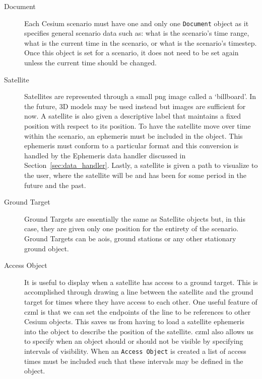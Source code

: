 \begin{description} 

    \item[Document] Each Cesium scenario must have one and only one
	\texttt{Document} object as it specifies general scenario data such as:
	what is the scenario's time range, what is the current time in the
	scenario, or what is the scenario's timestep. Once this object is set
	for a scenario, it does not need to be set again unless the current
	time should be changed.

    \item[Satellite] Satellites are represented through a small \gls{png} image
	called a `billboard'. In the future, 3D models may be used instead but
	images are sufficient for now. A satellite is also given a descriptive
	label that maintains a fixed position with respect to its position. To
	have the satellite move over time within the scenario, an ephemeris
	must be included in the object.  This ephemeris must conform to a
	particular format and this conversion is handled by the Ephemeris data
	handler discussed in Section~\ref{sec:data_handler}.  Lastly, a
	satellite is given a path to visualize to the user, where the satellite
	will be and has been for some period in the future and the past.

    \item[Ground Target] Ground Targets are essentially the same as Satellite
	objects but, in this case, they are given only one position for the
	entirety of the scenario. Ground Targets can be \glspl{aoi}, ground
	stations or any other stationary ground object.

    \item[Access Object] It is useful to display when a satellite has access to
	a ground target. This is accomplished through drawing a line between
	the satellite and the ground target for times where they have access to
	each other. One useful feature of \gls{czml} is that we can set the
	endpoints of the line to be references to other Cesium objects. This
	saves us from having to load a satellite ephemeris into the object to
	describe the position of the satellite. \gls{czml} also allows us to
	specify when an object should or should not be visible by specifying
	intervals of visibility.  When an \texttt{Access Object} is created a
	list of access times must be included such that these intervals may be
	defined in the object.


\end{description}
